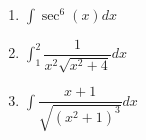 \documentclass[11pt]{article}
\begin{document}
\begin{enumerate}
\begin{enumerate}
            \item $\displaystyle\int\sec^{6}(x)dx$\vfill
            \newpage
            \item $\displaystyle\int_{1}^{2}\dfrac{1}{x^{2}\sqrt{x^{2}+4}}dx$\vfill
            \item $\displaystyle\int\dfrac{x+1}{\sqrt{(x^{2}+1)^{3}}}dx$\vfill
        \end{enumerate}
    \end{enumerate}
\end{document}
